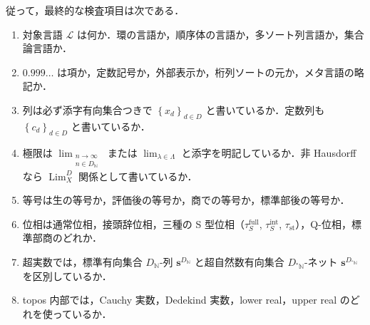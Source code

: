 \documentclass[a4paper,11pt]{ltjsarticle}
\theoremstyle{jpdef}
\theoremstyle{jpthm}
\newcommand{\N}{\mathbb{N}}
\newcommand{\Lang}{\mathcal L}
\newcommand{\Lim}{\operatorname{Lim}}
\newcommand{\DN}{D_{\N}}
\newcommand{\DStarN}{D_{{}^{\ast}\N}}
\newcommand{\seq}[2]{\left\{#1\right\}_{#2}}
\newcommand{\taufullS}{\tau^{\mathrm{full}}_{S}}
\newcommand{\tauintS}{\tau^{\mathrm{int}}_{S}}
\newcommand{\taust}{\tau_{\mathrm{st}}}
\begin{document}
従って，最終的な検査項目は次である．
\begin{enumerate}
\item 対象言語 \(\Lang\) は何か．環の言語か，順序体の言語か，多ソート列言語か，集合論言語か．
\item \(0.999\ldots\) は項か，定数記号か，外部表示か，桁列ソートの元か，メタ言語の略記か．
\item 列は必ず添字有向集合つきで \(\seq{x_d}{d\in D}\) と書いているか．定数列も \(\seq{c_d}{d\in D}\) と書いているか．
\item 極限は \(\lim_{\substack{n\to\infty\\ n\in\DN}}\) または \(\lim_{\lambda\in\Lambda}\) と添字を明記しているか．非 Hausdorff なら \(\Lim_X^D\) 関係として書いているか．
\item 等号は生の等号か，評価後の等号か，商での等号か，標準部後の等号か．
\item 位相は通常位相，接頭辞位相，三種の S 型位相（\(\taufullS\), \(\tauintS\), \(\taust\)），Q-位相，標準部商のどれか．
\item 超実数では，標準有向集合 \(\DN\)-列 \(\mathbf s^{\DN}\) と超自然数有向集合 \(\DStarN\)-ネット \(\mathbf s^{\DStarN}\) を区別しているか．
\item topos 内部では，Cauchy 実数，Dedekind 実数，lower real，upper real のどれを使っているか．
\end{enumerate}
\end{document}
